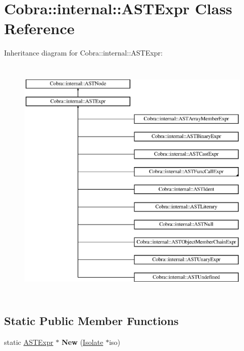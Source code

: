 \hypertarget{class_cobra_1_1internal_1_1_a_s_t_expr}{\section{Cobra\+:\+:internal\+:\+:A\+S\+T\+Expr Class Reference}
\label{class_cobra_1_1internal_1_1_a_s_t_expr}
}
Inheritance diagram for Cobra\+:\+:internal\+:\+:A\+S\+T\+Expr\+:\begin{figure}[H]
\begin{center}
\leavevmode
\includegraphics[height=12.000000cm]{class_cobra_1_1internal_1_1_a_s_t_expr}
\end{center}
\end{figure}
\subsection*{Static Public Member Functions}
\begin{DoxyCompactItemize}
\item 
\hypertarget{class_cobra_1_1internal_1_1_a_s_t_expr_ab5e3c5587c34a7b9c83f8a66c3ca444c}{static \hyperlink{class_cobra_1_1internal_1_1_a_s_t_expr}{A\+S\+T\+Expr} $\ast$ {\bfseries New} (\hyperlink{class_cobra_1_1internal_1_1_isolate}{Isolate} $\ast$iso)}\label{class_cobra_1_1internal_1_1_a_s_t_expr_ab5e3c5587c34a7b9c83f8a66c3ca444c}

\end{DoxyCompactItemize}
